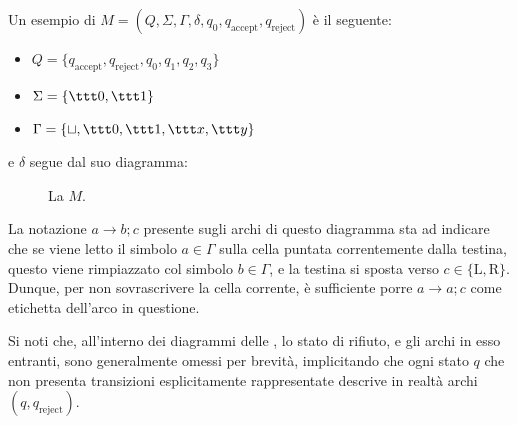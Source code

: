 \documentclass[a4paper, 12pt]{report}
\begin{document}
    \begin{example}[\TM]
        \label{tm ex}
        Un esempio di \TM $M = (Q, \Sigma, \Gamma, \delta, q_0, q_\mathrm{accept}, q_\mathrm{reject})$ è il seguente:

        \begin{itemize}
            \item $Q = \{q_\mathrm{accept}, q_\mathrm{reject}, q_0, q_1, q_2, q_3\}$
            \item $\Sigma = \{\ttt 0, \ttt 1\}$
            \item $\Gamma = \{\sqcup, \ttt 0, \ttt 1, \ttt x, \ttt y\}$
        \end{itemize}

        e $\delta$ segue dal suo diagramma:

        \begin{figure}[H]
            \centering
             \caption{La \TM $M$.}
         \end{figure}
         
         La notazione $a \to b;c$ presente sugli archi di questo diagramma sta ad indicare che se viene letto il simbolo $a \in \Gamma$ sulla cella puntata correntemente dalla testina, questo viene rimpiazzato col simbolo $b \in \Gamma$, e la testina si sposta verso $c \in \{\mathrm L, \mathrm R\}$. Dunque, per non sovrascrivere la cella corrente, è sufficiente porre $a \to a; c$ come etichetta dell'arco in questione.
         
         Si noti che, all'interno dei diagrammi delle \TM, lo stato di rifiuto, e gli archi in esso entranti, sono generalmente omessi per brevità, implicitando che ogni stato $q$ che non presenta transizioni esplicitamente rappresentate descrive in realtà archi $(q, q_\mathrm{reject})$.
    \end{example}
\end{document}
